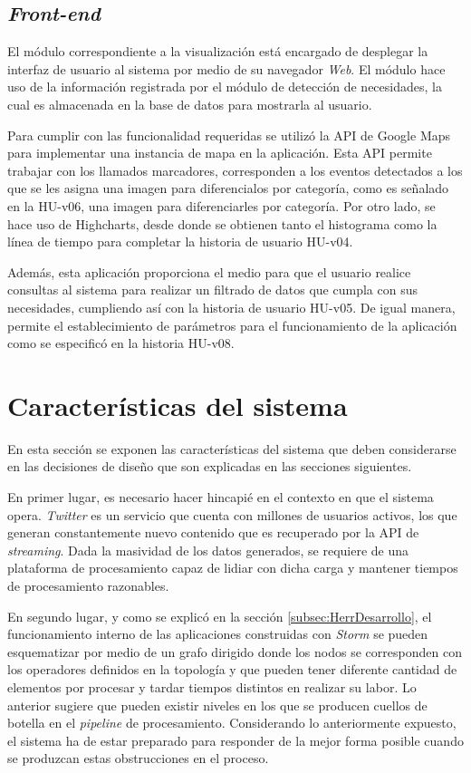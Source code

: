 \subsection{\textit{Front-end}}
\label{subsec:front}

El módulo correspondiente a la visualización está encargado de desplegar la interfaz de usuario al sistema por medio de su navegador \textit{Web}. El módulo hace uso de la información registrada por el módulo de detección de necesidades, la cual es almacenada en la base de datos para mostrarla al usuario. 

Para cumplir con las funcionalidad requeridas se utilizó la API de Google Maps para implementar una instancia de mapa en la aplicación. Esta API permite trabajar con los llamados marcadores, corresponden a los eventos detectados a los que se les asigna una imagen para diferencialos por categoría, como es señalado en la HU-v06, una imagen para diferenciarles por categoría. Por otro lado, se hace uso de Highcharts, desde donde se obtienen tanto el histograma como la línea de tiempo para completar la historia de usuario HU-v04.

Además, esta aplicación proporciona el medio para que el usuario realice consultas al sistema para realizar un filtrado de datos que cumpla con sus necesidades, cumpliendo así con la historia de usuario HU-v05. De igual manera, permite el establecimiento de parámetros para el funcionamiento de la aplicación como se especificó en la historia HU-v08.

\section{Características del sistema}
\label{sec:caracteristicasSistema}

En esta sección se exponen las características del sistema que deben considerarse en las decisiones de diseño que son explicadas en las secciones siguientes.

En primer lugar, es necesario hacer hincapié en el contexto en que el sistema opera. \textit{Twitter} es un servicio que cuenta con millones de usuarios activos, los que generan constantemente nuevo contenido que es recuperado por la API de \textit{streaming}. Dada la masividad de los datos generados, se requiere de una plataforma de procesamiento capaz de lidiar con dicha carga y mantener tiempos de procesamiento razonables.

En segundo lugar, y como se explicó en la sección \ref{subsec:HerrDesarrollo}, el funcionamiento interno de las aplicaciones construidas con \textit{Storm} se pueden esquematizar por medio de un grafo dirigido donde los nodos se corresponden con los operadores definidos en la topología y que pueden tener diferente cantidad de elementos por procesar y tardar tiempos distintos en realizar su labor. Lo anterior sugiere que pueden existir niveles en los que se producen cuellos de botella en el \textit{pipeline} de procesamiento. Considerando lo anteriormente expuesto, el sistema ha de estar preparado para responder de la mejor forma posible cuando se produzcan estas obstrucciones en el proceso.

